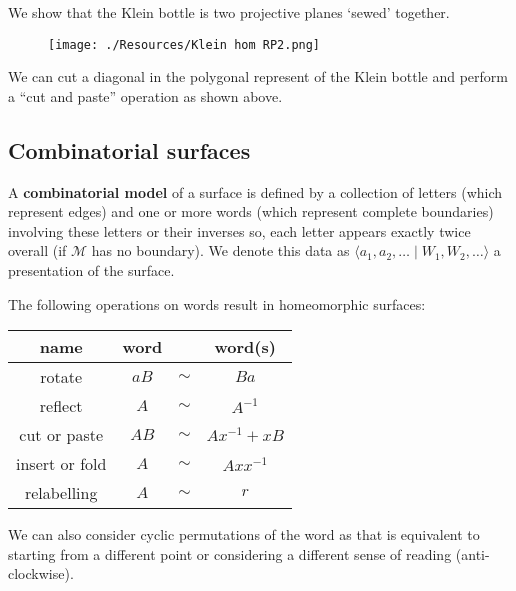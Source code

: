 \documentclass[12pt, a4paper]{article}
\begin{document}
\begin{mdexample}
    We show that the Klein bottle is two projective planes `sewed' together.
    \begin{figure}[H]
         \begin{center}
             \texttt{[image: ./Resources/Klein hom RP2.png]}
         \end{center}
    \end{figure}
    \noindent We can cut a diagonal in the polygonal represent of the Klein bottle and perform a ``cut and paste'' operation as shown above. 
\end{mdexample}


\subsection{Combinatorial surfaces}

\begin{definition}
    A \textbf{combinatorial model} of a surface is defined by a collection of letters (which represent edges) and one or more words (which represent complete boundaries) involving these letters or their inverses so, each letter appears exactly twice overall (if \(\mathcal{M}\) has no boundary). We denote this data as \(\langle a_1,a_2,\ldots \mid W_1,W_2,\ldots \rangle \) a presentation of the surface.
\end{definition}

\begin{mdprop}
    The following operations on words result in homeomorphic surfaces:
    
\begin{center}
    \begin{tabular}{c|ccc}
        \textbf{name} & \textbf{word} & &\textbf{word(s)} \\
        \hline
        rotate & \(aB\) & \(\sim\)&\( Ba\) \\
        reflect & \(A\) & \(\sim\)&\( A^{-1}\) \\
        cut or paste & \(AB\) & \(\sim\)&\(Ax^{-1} + xB\) \\ %
        insert or fold & \(A\) & \(\sim\)&\( Axx^{-1}\) \\
        relabelling & \(A\) & \(\sim\)&\( r\)
    \end{tabular}
\end{center}
We can also consider cyclic permutations of the word as that is equivalent to starting from a different point or considering a different sense of reading (anti-clockwise).
\end{mdprop}
\end{document}
